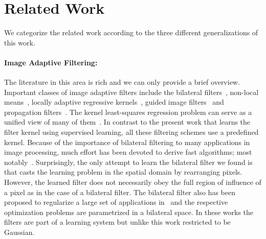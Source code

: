\section{Related Work}
\label{sec:related-bnn}

We categorize the related work according to the three different generalizations of this work.

\paragraph{Image Adaptive Filtering:} The literature in this area is rich
and we can only provide a brief overview. Important classes of image adaptive filters
include the bilateral filters~\cite{aurich1995non, tomasi1998bilateral,
smith97ijcv}, non-local means~\cite{buades2005non, awate2005higher}, locally
adaptive regressive kernels~\cite{takeda2007kernel}, guided image
filters~\cite{he2013guided} and propagation filters~\cite{chang2015propagated}.
The kernel least-squares regression problem can serve as a unified view of many
of them~\cite{milanfar2011tour}. In contrast to the present work that learns
the filter kernel using supervised learning, all these filtering schemes use a
predefined kernel.
Because of the importance of bilateral filtering to many applications in
image processing, much effort has been devoted to derive fast algorithms; most
notably~\cite{paris2006fast, adams2010fast, adams2009gaussian, gastal2012adaptive}.
Surprisingly, the
only attempt to learn the bilateral filter we found is~\cite{hu2007trained} that
casts the learning problem in the spatial domain by rearranging pixels. However,
the learned filter does not necessarily obey the full region of influence of a
pixel as in the case of a bilateral filter.
The bilateral filter also has been proposed to regularize a large set of
applications in~\cite{barron2015bilateral, barron2015defocus} and the respective
optimization problems are parametrized in a bilateral space.
In these works the filters are part of a learning system but unlike this work
restricted to be Gaussian.

